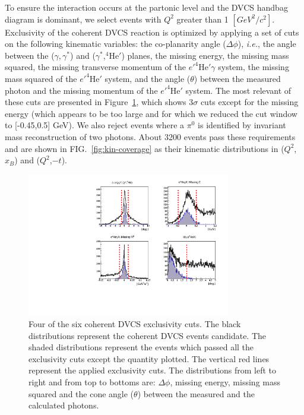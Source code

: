 \documentclass[twocolumn,nofootinbib,showpacs,prl,superscriptaddress,secnumarabic,amssymb,nobibnotes,aps,floatfix]{revtex4}
\begin{document}
To ensure the interaction occurs at the partonic level and the DVCS handbag 
diagram is dominant, we select events with $Q^{2}$ greater than 1 
$[GeV^{2}/c^{2}]$. Exclusivity of the coherent DVCS reaction is optimized by 
applying a set of cuts on the following kinematic variables: the co-planarity 
angle ($\Delta \phi$), \textit{i.e.}, the angle between the ($\gamma,\gamma^*$) 
and ($\gamma^*$,$^4$He$'$) planes, the missing energy, the missing mass 
squared, the missing transverse momentum of the $e'^4$He$'\gamma$ system, the 
missing mass squared of the $e'^4$He$'$ system, and the angle ($\theta$) 
between the measured photon and the missing momentum of the $e'^4$He$'$ system.  
The most relevant of these cuts are presented in Figure~\ref{fig:kin-cuts}, 
which shows 3$\sigma$ cuts except for the missing energy (which appears to be 
too large and for which we reduced the cut window to [-0.45,0.5] GeV).  We also 
reject events where a $\pi^0$ is identified by invariant mass reconstruction of 
two photons.  About 3200 events pass these requirements and are shown in 
FIG.~\ref{fig:kin-coverage} as their kinematic distributions in 
($Q^{2}$,$x_{B}$) and ($Q^{2}$,$-t$).

\begin{figure}[tb]
\includegraphics[width=8.9cm]{figs/coh_exc_cuts.pdf}
\caption{Four of the six coherent DVCS exclusivity cuts. The black 
distributions represent the coherent DVCS events candidate. The shaded 
distributions represent the events which passed all the exclusivity cuts except 
the quantity plotted. The vertical red lines represent the applied exclusivity 
cuts. The distributions from left to right and from top to bottoms are: $\Delta 
\phi$, missing energy, missing mass squared and the cone angle ($\theta$) 
between the measured and the calculated photons.}
\label{fig:kin-cuts}
\end{figure}
 
\end{document}
